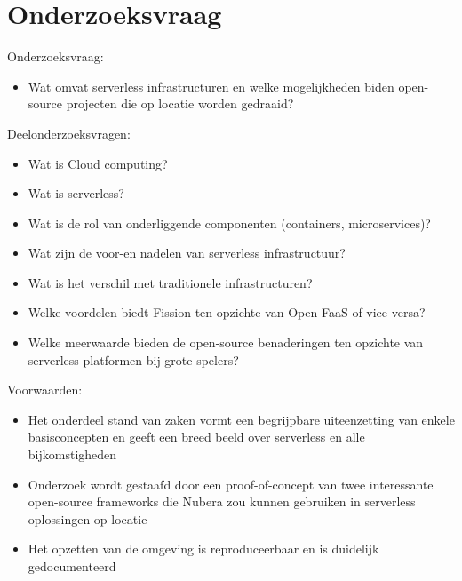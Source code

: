 \section{Onderzoeksvraag}
\label{sec:onderzoeksvraag}


Onderzoeksvraag: 
\begin{itemize}
    \item Wat omvat serverless infrastructuren en welke mogelijkheden biden open-source projecten die op locatie worden gedraaid?
\end{itemize}

Deelonderzoeksvragen: 
\begin{itemize}
    \item Wat is Cloud computing?
    \item Wat is serverless?
    \item Wat is de rol van onderliggende componenten (containers, microservices)?
    \item Wat zijn de voor-en nadelen van serverless infrastructuur?
    \item Wat is het verschil met traditionele infrastructuren?
    \item Welke voordelen biedt Fission ten opzichte van Open-FaaS of vice-versa?
    \item Welke meerwaarde bieden de open-source benaderingen ten opzichte van serverless platformen bij grote spelers?
\end{itemize}

Voorwaarden: 
\begin{itemize}
    \item Het onderdeel stand van zaken vormt een begrijpbare uiteenzetting van enkele basisconcepten en geeft een breed beeld over serverless en alle bijkomstigheden
    \item Onderzoek wordt gestaafd door een proof-of-concept van  twee interessante open-source frameworks die  Nubera zou kunnen gebruiken in serverless oplossingen op locatie
    \item Het opzetten van de omgeving is reproduceerbaar en is duidelijk gedocumenteerd
\end{itemize}



